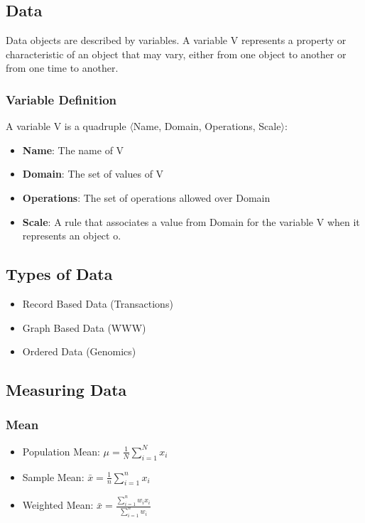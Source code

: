 \subsection*{Data}
Data objects are described by variables. A variable V represents a property or characteristic of an object that may vary, either from one object to another or from one time to another.

\subsubsection*{Variable Definition}
A variable V is a quadruple $\langle$Name, Domain, Operations, Scale$\rangle$:
\begin{itemize}[noitemsep]
    \item \textbf{Name}: The name of V
    \item \textbf{Domain}: The set of values of V
    \item \textbf{Operations}: The set of operations allowed over Domain
    \item \textbf{Scale}: A rule that associates a value from Domain for the variable V when it represents an object o.
\end{itemize}

\subsection*{Types of Data}
\begin{itemize}[noitemsep]
    \item Record Based Data (Transactions)
    \item Graph Based Data (WWW)
    \item Ordered Data (Genomics)
\end{itemize}

\subsection*{Measuring Data}
\subsubsection*{Mean}
\begin{itemize}[noitemsep]
    \item Population Mean: $\mu = \frac{1}{N} \sum_{i=1}^{N} x_i$
    \item Sample Mean: $\bar{x} = \frac{1}{n} \sum_{i=1}^{n} x_i$
    \item Weighted Mean: $\bar{x} = \frac{\sum_{i=1}^{n} w_i x_i}{\sum_{i=1}^{n} w_i}$
\end{itemize}


